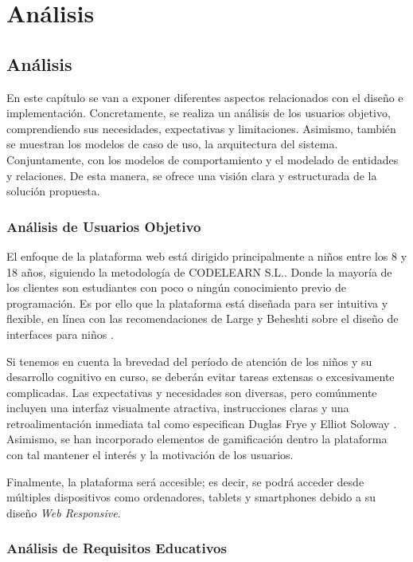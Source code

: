 \chapter{Análisis} \label{chap:analisis}

\section{Análisis}

En este capítulo se van a exponer diferentes aspectos relacionados con el diseño e implementación. Concretamente, se realiza un análisis de los usuarios objetivo, comprendiendo sus necesidades, expectativas y limitaciones. Asimismo, también se muestran los modelos de caso de uso, la arquitectura del sistema. Conjuntamente, con los modelos de comportamiento y el modelado de entidades y relaciones. De esta manera, se ofrece una visión clara y estructurada de la solución propuesta.

\subsection{Análisis de Usuarios Objetivo}

El enfoque de la plataforma web está dirigido principalmente a niños entre los 8 y 18 años, siguiendo la metodología de CODELEARN S.L.. Donde la mayoría de los clientes son estudiantes con poco o ningún conocimiento previo de programación. Es por ello que la plataforma está diseñada para ser intuitiva y flexible, en línea con las recomendaciones de Large y Beheshti sobre el diseño de interfaces para niños \cite{large2005}.

Si tenemos en cuenta la brevedad del período de atención de los niños y su desarrollo cognitivo en curso, se deberán evitar tareas extensas o excesivamente complicadas. Las expectativas y necesidades son diversas, pero comúnmente incluyen una interfaz visualmente atractiva, instrucciones claras y una retroalimentación inmediata tal como especifican Duglas Frye y Elliot Soloway \cite{interfacedesign}. Asimismo, se han incorporado elementos de gamificación dentro la plataforma con tal mantener el interés y la motivación de los usuarios. 

Finalmente, la plataforma será accesible; es decir, se podrá acceder desde múltiples dispositivos como ordenadores, tablets y smartphones debido a su diseño \textit{Web Responsive}.

\subsection{Análisis de Requisitos Educativos}

